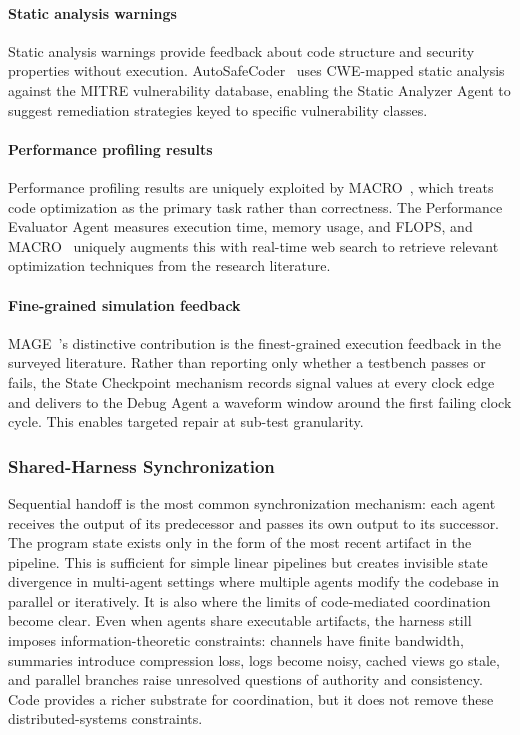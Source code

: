 \paragraph{Static analysis warnings} Static analysis warnings
provide feedback about code structure and security properties
without execution. AutoSafeCoder~\cite{Nunez2024AutoSafeCoder}
uses CWE-mapped static analysis against the MITRE vulnerability
database, enabling the Static Analyzer Agent to suggest
remediation strategies keyed to specific vulnerability classes.

\paragraph{Performance profiling results} Performance profiling
results are uniquely exploited by MACRO~\cite{Rahman2025MACRO},
which treats code optimization as the primary task rather than
correctness. The Performance Evaluator Agent measures execution
time, memory usage, and FLOPS, and MACRO~\cite{Rahman2025MACRO} uniquely augments this
with real-time web search to retrieve relevant optimization
techniques from the research literature.

\paragraph{Fine-grained simulation feedback} MAGE~\cite{Zhao2024MAGE}'s
distinctive contribution is the finest-grained execution feedback
in the surveyed literature. Rather than reporting only whether a
testbench passes or fails, the State Checkpoint mechanism records
signal values at every clock edge and delivers to the Debug Agent
a waveform window around the first failing clock cycle. This
enables targeted repair at sub-test granularity.


\subsubsection{Shared-Harness Synchronization}

Sequential handoff is the most common synchronization mechanism:
each agent receives the output of its predecessor and passes its
own output to its successor. The program state exists only in the
form of the most recent artifact in the pipeline. This is
sufficient for simple linear pipelines but creates invisible
state divergence in multi-agent settings where multiple agents
modify the codebase in parallel or iteratively. {It
is also where the limits of code-mediated coordination become
clear. Even when agents share executable artifacts, the harness
still imposes information-theoretic constraints: channels have
finite bandwidth, summaries introduce compression loss, logs
become noisy, cached views go stale, and parallel branches raise
unresolved questions of authority and consistency. Code provides
a richer substrate for coordination, but it does not remove
these distributed-systems constraints.}

